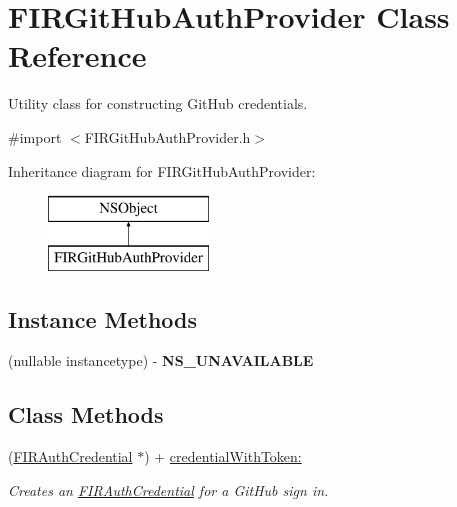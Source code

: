 \hypertarget{interface_f_i_r_git_hub_auth_provider}{}\section{F\+I\+R\+Git\+Hub\+Auth\+Provider Class Reference}
\label{interface_f_i_r_git_hub_auth_provider}


Utility class for constructing Git\+Hub credentials.  




{\ttfamily \#import $<$F\+I\+R\+Git\+Hub\+Auth\+Provider.\+h$>$}

Inheritance diagram for F\+I\+R\+Git\+Hub\+Auth\+Provider\+:\begin{figure}[H]
\begin{center}
\leavevmode
\includegraphics[height=2.000000cm]{interface_f_i_r_git_hub_auth_provider}
\end{center}
\end{figure}
\subsection*{Instance Methods}
\begin{DoxyCompactItemize}
\item 
\hypertarget{interface_f_i_r_git_hub_auth_provider_a9bd3227630fadda5df4917ab5ad1b557}{}(nullable instancetype) -\/ {\bfseries N\+S\+\_\+\+U\+N\+A\+V\+A\+I\+L\+A\+B\+L\+E}\label{interface_f_i_r_git_hub_auth_provider_a9bd3227630fadda5df4917ab5ad1b557}

\end{DoxyCompactItemize}
\subsection*{Class Methods}
\begin{DoxyCompactItemize}
\item 
(\hyperlink{interface_f_i_r_auth_credential}{F\+I\+R\+Auth\+Credential} $\ast$) + \hyperlink{interface_f_i_r_git_hub_auth_provider_a6a59dad3af70fa29a788c1085b4498ac}{credential\+With\+Token\+:}
\begin{DoxyCompactList}\small\item\em Creates an {\ttfamily \hyperlink{interface_f_i_r_auth_credential}{F\+I\+R\+Auth\+Credential}} for a Git\+Hub sign in. \end{DoxyCompactList}\end{DoxyCompactItemize}


